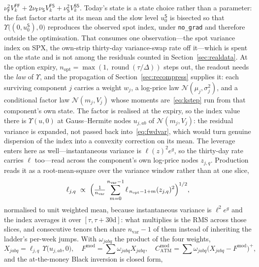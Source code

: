 \documentclass[11pt]{article}
\newcommand{\cN}{\mathcal{N}}
\providecommand{\1}{\mathbf 1}
\begin{document}
$\nu_{\mathsf F}^2V^{\mathsf{FF}}_k+2\nu_{\mathsf F}\nu_{\mathsf S}V^{\mathsf{FS}}_k
+\nu_{\mathsf S}^2V^{\mathsf{SS}}_k$. Today's state is a state choice rather than a parameter: the
fast factor starts at its mean and the slow level $u^{\mathsf S}_0$ is bisected so that
$\Upsilon\bigl((0,u^{\mathsf S}_0),0\bigr)$ reproduces the observed spot index, under
\texttt{no\_grad} and therefore outside the optimisation. That consumes one observation---the spot
variance index on SPX, the own-strip thirty-day variance-swap rate off it---which is spent on the
state and is not among the residuals counted in Section~\ref{sec:realdata}.
At the option expiry, $n_{\mathrm{opt}}=\max(1,\operatorname{round}(\tau/\Delta))$ steps out, the readout needs the \emph{law} of
$\Upsilon$, and the propagation of Section~\ref{sec:recompress} supplies it: each surviving
component $j$ carries a weight $w_j$, a log-price law $\cN(\mu_j,\sigma_j^2)$, and a conditional
factor law $\cN(m_j,V_j)$ whose moments are~\eqref{eq:kstep} run from that component's own state.
The factor is realised at the expiry, so the index value there is $\Upsilon(u,0)$ at
Gauss--Hermite nodes $u_{j,ab}$ of $\cN(m_j,V_j)$: the residual variance is expanded, not passed
back into~\eqref{eq:fwdvar}, which would turn genuine dispersion of the index into a convexity
correction on its mean. The leverage enters here as well---instantaneous variance is
$\ell(z)^2e^{g}$, so the thirty-day rate carries $\ell$ too---read across the component's own
log-price nodes $z_{j,q}$. Production reads it as a root-mean-square over the variance window
rather than at one slice,
\begin{equation}\label{eq:lamrms}
  \ell_{j,q}\ \propto\ \Bigl(\tfrac{1}{n_{\mathrm{var}}}\sum_{m=0}^{n_{\mathrm{var}}-1}
    \ell_{\,n_{\mathrm{opt}}-1+m}(z_{j,q})^{2}\Bigr)^{1/2},
\end{equation}
normalised to unit weighted mean, because instantaneous variance is $\ell^2e^{g}$ and the index
averages it over $[\tau,\tau+30\text{d}]$: what multiplies is the RMS across those slices, and
consecutive tenors then share $n_{\mathrm{var}}-1$ of them instead of inheriting the ladder's
per-week jumps. With $\omega_{jabq}$ the product of the four weights,
\begin{equation}\label{eq:vixatm}
  X_{jabq}=\ell_{j,q}\,\Upsilon\bigl(u_{j,ab},0\bigr),\quad
  F^{\mathrm{mod}}=\sum\omega_{jabq}X_{jabq},\quad
  C^{\mathrm{mod}}_{\mathrm{ATM}}=\sum\omega_{jabq}\bigl(X_{jabq}-F^{\mathrm{mod}}\bigr)^{+},
\end{equation}
and the at-the-money Black inversion is closed form,
\end{document}

